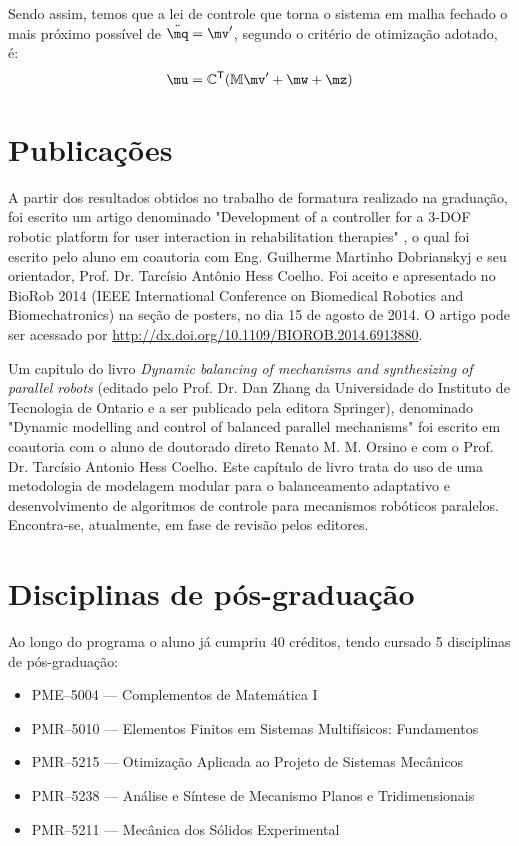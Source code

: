 \documentclass[a4paper,11pt,brazil,fleqn]{article}
\begin{document}
Sendo assim, temos que a lei de controle que torna o sistema em malha fechado o mais pr\'oximo poss\'ivel de $\ddot{\mq} = \mv'$, segundo o crit\'erio de otimiza\c{c}\~ao adotado, \'e:
\begin{equation} \label{eq:ControlLawFinal}
\mu = \mC^\msT ( \mM \mv' + \mw + \mz )
\end{equation}

\section{Publica\c{c}\~oes}\label{S05}

A partir dos resultados obtidos no trabalho de formatura realizado na gradua\c{c}\~ao, foi escrito um artigo denominado
"Development of a controller for a 3-DOF robotic platform for user interaction in rehabilitation therapies" \cite{Andre2}, o qual foi escrito pelo aluno em coautoria com Eng. Guilherme Martinho Dobrianskyj e seu orientador, Prof. Dr. Tarc\'isio Ant\^onio Hess Coelho. Foi aceito e apresentado no BioRob 2014 (IEEE International Conference on Biomedical Robotics and Biomechatronics) na se\c{c}\~ao de posters, no dia 15 de agosto de 2014. O artigo pode ser acessado por \url{http://dx.doi.org/10.1109/BIOROB.2014.6913880}.

Um capitulo do livro {\em Dynamic balancing of mechanisms and synthesizing of parallel
robots}  (editado pelo Prof. Dr. Dan Zhang da Universidade do Instituto de Tecnologia
de Ontario e a ser publicado pela editora Springer), denominado "Dynamic modelling
and control of balanced parallel mechanisms" foi escrito em coautoria com o aluno de
doutorado direto Renato M. M. Orsino e com o Prof. Dr. Tarc\'isio Antonio Hess Coelho.
Este cap\'itulo de livro trata do uso de uma metodologia de modelagem modular para o
balanceamento adaptativo e desenvolvimento de algoritmos de controle para mecanismos
rob\'oticos paralelos. Encontra-se, atualmente, em fase de revis\~ao pelos editores.

\section{Disciplinas de p\'os-gradua\c{c}\~ao}\label{S06}

Ao longo do programa o aluno j\'a cumpriu 40 cr\'editos, tendo cursado 5 disciplinas 
de p\'os-gradua\c{c}\~ao:
\begin{itemize}
\item PME--5004 --- Complementos de Matem\'atica I
\item PMR--5010 --- Elementos Finitos em Sistemas Multif\'isicos: Fundamentos
\item PMR--5215 --- Otimiza\c{c}\~ao Aplicada ao Projeto de Sistemas Mec\^anicos
\item PMR--5238 --- An\'alise e S\'intese de Mecanismo Planos e Tridimensionais
\item PMR--5211 --- Mec\^anica dos S\'olidos Experimental
\end{itemize}
\end{document}
